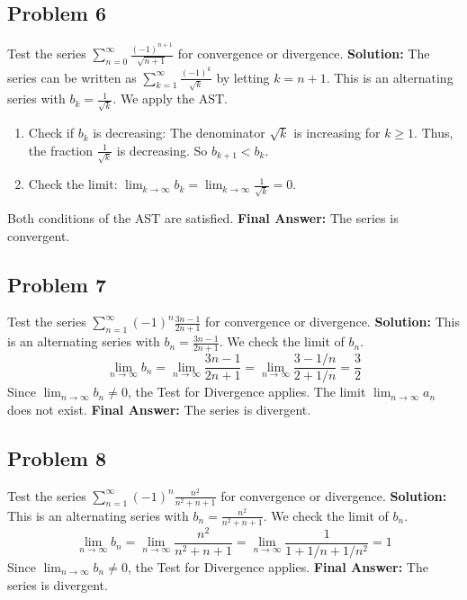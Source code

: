 \documentclass{article}
\begin{document}
\subsection*{Problem 6}
Test the series $\sum_{n=0}^{\infty} \frac{(-1)^{n+1}}{\sqrt{n+1}}$ for convergence or divergence.
\textbf{Solution:} The series can be written as $\sum_{k=1}^{\infty} \frac{(-1)^{k}}{\sqrt{k}}$ by letting $k=n+1$. This is an alternating series with $b_k = \frac{1}{\sqrt{k}}$. We apply the AST.
\begin{enumerate}
    \item Check if $b_k$ is decreasing: The denominator $\sqrt{k}$ is increasing for $k \ge 1$. Thus, the fraction $\frac{1}{\sqrt{k}}$ is decreasing. So $b_{k+1} < b_k$.
    \item Check the limit: $\lim_{k \to \infty} b_k = \lim_{k \to \infty} \frac{1}{\sqrt{k}} = 0$.
\end{enumerate}
Both conditions of the AST are satisfied.
\textbf{Final Answer:} The series is convergent.

\subsection*{Problem 7}
Test the series $\sum_{n=1}^{\infty} (-1)^n \frac{3n-1}{2n+1}$ for convergence or divergence.
\textbf{Solution:} This is an alternating series with $b_n = \frac{3n-1}{2n+1}$. We check the limit of $b_n$.
\[ \lim_{n \to \infty} b_n = \lim_{n \to \infty} \frac{3n-1}{2n+1} = \lim_{n \to \infty} \frac{3-1/n}{2+1/n} = \frac{3}{2} \]
Since $\lim_{n \to \infty} b_n \neq 0$, the Test for Divergence applies. The limit $\lim_{n \to \infty} a_n$ does not exist.
\textbf{Final Answer:} The series is divergent.

\subsection*{Problem 8}
Test the series $\sum_{n=1}^{\infty} (-1)^n \frac{n^2}{n^2+n+1}$ for convergence or divergence.
\textbf{Solution:} This is an alternating series with $b_n = \frac{n^2}{n^2+n+1}$. We check the limit of $b_n$.
\[ \lim_{n \to \infty} b_n = \lim_{n \to \infty} \frac{n^2}{n^2+n+1} = \lim_{n \to \infty} \frac{1}{1+1/n+1/n^2} = 1 \]
Since $\lim_{n \to \infty} b_n \neq 0$, the Test for Divergence applies.
\textbf{Final Answer:} The series is divergent.
\end{document}
